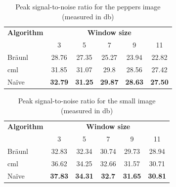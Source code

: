 \begin{table}
\centering
\caption[Peak signal-to-noise for the peppers image]{Peak signal-to-noise ratio for the peppers image (measured in \unit{\decibel})}
\begin{tabular}{@{}lccccc@{}}
\toprule
\multicolumn{1}{c}{\textbf{Algorithm}} & \multicolumn{5}{c}{\textbf{Window size}}                                          \\
                                       & 3              & 5              & 7              & 9              & 11            \\ \midrule
Bräunl                                 & 28.76          & 27.35          & 25.27          & 23.94          & 22.82         \\
\gls{cml}                                    & 31.85          & 31.07          & 29.8           & 28.56          & 27.42         \\
Naïve                                  & \textbf{32.79} & \textbf{31.25} & \textbf{29.87} & \textbf{28.63} & \textbf{27.50} \\ \bottomrule
\end{tabular}
\label{tab:median:psnrpeppers}
\end{table}

\begin{table}
\centering
\caption[Peak signal-to-noise for the small image]{Peak signal-to-noise ratio for the small image (measured in \unit{\decibel})}
\label{tab:median:psnrsmall}
\begin{tabular}{@{}lccccc@{}}
\toprule
\multicolumn{1}{c}{\textbf{Algorithm}} & \multicolumn{5}{c}{\textbf{Window size}}                                          \\
                                       & 3              & 5              & 7             & 9              & 11             \\ \midrule
Bräunl                                 & 32.83          & 32.34          & 30.74         & 29.73          & 28.94          \\
\gls{cml}                                    & 36.62          & 34.25          & 32.66         & 31.57          & 30.71          \\
Naïve                                  & \textbf{37.83} & \textbf{34.31} & \textbf{32.7} & \textbf{31.65} & \textbf{30.81} \\ \bottomrule
\end{tabular}
\end{table}

